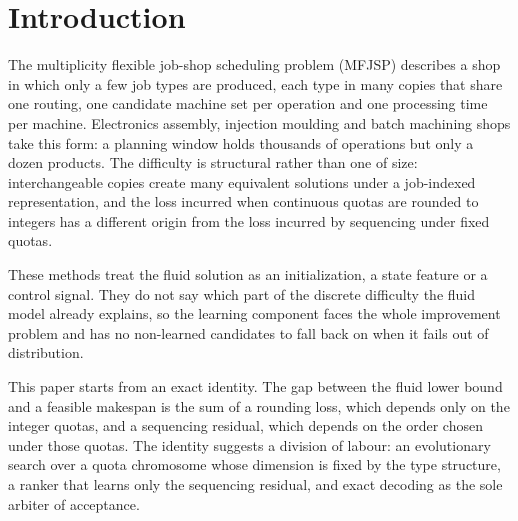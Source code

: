 \section{Introduction}\label{sec:intro}

The multiplicity flexible job-shop scheduling problem (MFJSP) describes a shop in which only a few job types are
produced, each type in many copies that share one routing, one candidate machine set per operation and one processing
time per machine. Electronics assembly, injection moulding and batch machining shops take this form: a planning window
holds thousands of operations but only a dozen products.  The difficulty is
structural rather than one of size: interchangeable copies create many equivalent solutions under a job-indexed
representation, and the loss incurred when continuous quotas are rounded to integers has a different origin from the loss
incurred by sequencing under fixed quotas.

 These methods treat the fluid solution as an
initialization, a state feature or a control signal. They do not say which part of the discrete difficulty the fluid model
already explains, so the learning component faces the whole improvement problem and has no non-learned candidates to fall
back on when it fails out of distribution.

This paper starts from an exact identity. The gap between the fluid lower bound and a feasible makespan is the sum of a
rounding loss, which depends only on the integer quotas, and a sequencing residual, which depends on the order chosen
under those quotas. The identity suggests a division of labour: an evolutionary search over a quota chromosome whose
dimension is fixed by the type structure, a ranker that learns only the sequencing residual, and exact decoding as the sole
arbiter of acceptance.


